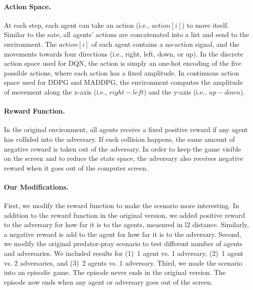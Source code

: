 \paragraph{Action Space.} At each step, each agent can take an action (i.e.,
$action[i]$) to move itself. Similar to the sate, all agents' actions are
concatenated into a list and send to the environment. The $action[i]$ of each
agent contains a no-action signal, and the movements towards four directions 
(i.e., right, left, down, or up). In the discrete action space used for DQN,
the action is simply an one-hot encoding of the five possible actions, where
each action has a fixed amplitude. In continuous action space used for DDPG
and MADDPG, the environment computes the amplitude of movement along the
x-axis (i.e., $right - left$) and the y-axis (i.e., $up - down$).

\paragraph{Reward Function.} In the original environment, all agents receive
a fixed positive reward if any agent has collided into the adversary. If such
collision happens, the same amount of negative reward is taken out of the
adversary. In order to keep the game visible on the screen and to reduce the
state space, the adversary also receives negative reward when it goes out of
the computer screen.

\paragraph{Our Modifications.} First, we modify the reward function to make
the scenario more interesting. In addition to the reward function in the
original version, we added positive reward to the adversary for how far it
is to the agents, measured in l2 distance. Similarly, a negative reward is add
to the agent for how far it is to the adversary.
Second, we modify the original predator-pray
scenario to test different number of agents and adversaries. We included
results for (1)~1 agent vs. 1 adversary, (2)~1 agent vs. 2 adversaries, and 
(3)~2 agents vs. 1 adversary. Third, we made the scenario into an episodic
game. The episode never ends in the original version. The episode now ends
when any agent or adversary goes out of the screen.

